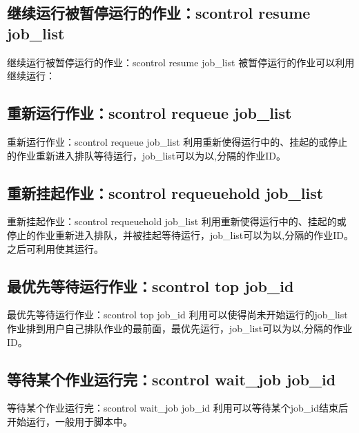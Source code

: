 \subsection{继续运行被暂停运行的作业：scontrol resume job\_list}
\begin{frame}{继续运行被暂停运行的作业：scontrol resume job\_list}
被暂停运行的作业可以利用继续运行：

\end{frame}

\subsection{重新运行作业：scontrol requeue job\_list}
\begin{frame}{重新运行作业：scontrol requeue job\_list}
利用重新使得运行中的、挂起的或停止的作业重新进入排队等待运行，job\_list可以为以,分隔的作业ID。
\end{frame}

\subsection{重新挂起作业：scontrol requeuehold job\_list}
\begin{frame}{重新挂起作业：scontrol requeuehold job\_list}
利用重新使得运行中的、挂起的或停止的作业重新进入排队，并被挂起等待运行，job\_list可以为以,分隔的作业ID。之后可利用使其运行。

\end{frame}

\subsection{最优先等待运行作业：scontrol top job\_id}
\begin{frame}{最优先等待运行作业：scontrol top job\_id}
利用可以使得尚未开始运行的job\_list作业排到用户自己排队作业的最前面，最优先运行，job\_list可以为以,分隔的作业ID。

\end{frame}

\subsection{等待某个作业运行完：scontrol wait\_job job\_id}
\begin{frame}{等待某个作业运行完：scontrol wait\_job job\_id}
利用可以等待某个job\_id结束后开始运行，一般用于脚本中。

\end{frame}

